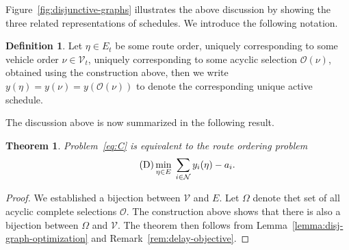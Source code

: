 \documentclass{report}
\theoremstyle{definition}
\newtheorem{define}{Definition}[chapter]
\theoremstyle{plain}
\newtheorem{theorem}{Theorem}[chapter]
\begin{document}
Figure~\ref{fig:disjunctive-graphs} illustrates the above discussion by showing the three related
representations of schedules.
%
We introduce the following notation.

\pagebreak
\begin{define}\label{def:orders}
  Let $\eta \in E_t$ be some route order, uniquely corresponding to some vehicle
  order $\nu \in \mathcal{V}_t$, uniquely corresponding to some acyclic
  selection $\mathcal{O}(\nu)$, obtained using the construction above, then we
  write $y(\eta) = y(\nu) = y(\mathcal{O}(\nu))$ to denote the corresponding unique
  active schedule.
\end{define}

The discussion above is now summarized in the following result.

\begin{theorem}
  Problem~\eqref{eq:C} is equivalent to the \emph{route ordering problem}
  \begin{align}\label{eq:D}
    \tag{$\mathrm{D}$}
    \min_{\eta \in E} \; \sum_{i \in \mathcal{N}} y_i(\eta) - a_i .
  \end{align}
\end{theorem}
\begin{proof}
  We established a bijection between $\mathcal{V}$ and $E$. Let $\Omega$ denote thet
  set of all acyclic complete selections $\mathcal{O}$. The construction above
  shows that there is also a bijection between $\Omega$ and $\mathcal{V}$.
  The theorem then follows from Lemma~\ref{lemma:disj-graph-optimization} and Remark~\ref{rem:delay-objective}.
\end{proof}



\end{document}
